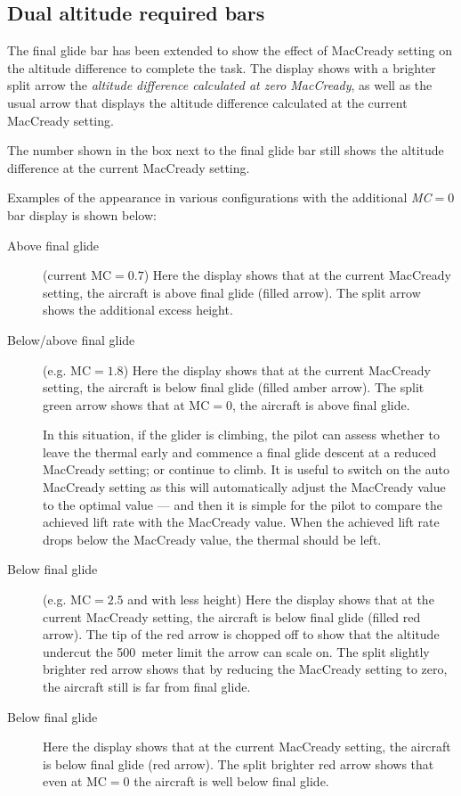 \subsection*{Dual altitude required bars}

The final glide bar has been extended to show the effect of MacCready
setting on the altitude difference to complete the task.  The display
shows with a brighter split arrow the \emph{altitude difference calculated at zero
MacCready}, as well as the usual arrow that displays the
altitude difference calculated at the current MacCready setting.

The number shown in the box next to the final glide bar still shows
the altitude difference at the current MacCready setting.

Examples of the appearance in various configurations with the additional \emph{MC$=0$} 
bar display is shown below:

\begin{description}
\item[Above final glide] (current MC$=0.7$)
  Here the display shows that at the current MacCready setting, the aircraft
  is above final glide (filled arrow).  The split arrow shows the additional
  excess height.

\item[Below/above final glide] (e.g. MC$=1.8$)
  Here the display shows that at the current MacCready setting, the aircraft
  is below final glide (filled amber arrow).  The split green arrow
  shows that at MC$=0$, the aircraft is above final glide.

  In this situation, if the glider is climbing, the pilot can assess
  whether to leave the thermal early and commence a final glide
  descent at a reduced MacCready setting; or continue to climb.  It is
  useful to switch on the auto MacCready setting as this will
  automatically adjust the MacCready value to the optimal value ---
  and then it is simple for the pilot to compare the achieved lift
  rate with the MacCready value.  When the achieved lift rate drops
  below the MacCready value, the thermal should be left.

\item[Below final glide] (e.g. MC$=2.5$ and with less height)
  Here the display shows that at the current MacCready setting, the aircraft
  is below final glide (filled red arrow).  The tip of the red arrow is chopped off
  to show that the altitude undercut the 500~meter limit the arrow can scale on.
  The split slightly brighter red arrow shows that by reducing the MacCready 
  setting to zero, the aircraft still is far from final glide.

\item[Below final glide] 
  Here the display shows that at the current MacCready setting, the aircraft
  is below final glide (red arrow).  The split brighter red arrow
  shows that even at MC$=0$ the aircraft is well below final glide.
\end{description}


